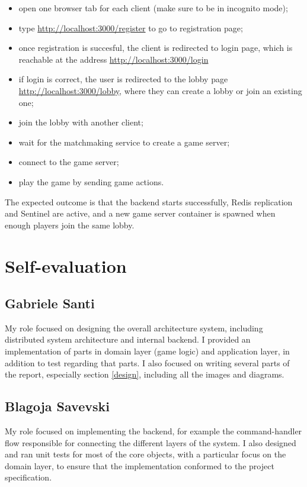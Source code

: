\documentclass{scrartcl}
\begin{document}
\begin{itemize}
    \item open one browser tab for each client (make sure to be in incognito mode);
    \item type \url{http://localhost:3000/register} to go to registration page;
    \item once registration is succesful, the client is redirected to login page, which is reachable at the address \url{http://localhost:3000/login}
    \item if login is correct, the user is redirected to the lobby page \url{http://localhost:3000/lobby}, where they can create a lobby or join an existing one;
    \item join the lobby with another client;
    \item wait for the matchmaking service to create a game server;
    \item connect to the game server;
    \item play the game by sending game actions.
\end{itemize}

The expected outcome is that the backend starts successfully, Redis replication and Sentinel are active, and a new game server container is spawned when enough players join the same lobby. 
\newpage

\section{Self-evaluation}\label{self-evaluation}
\subsection{Gabriele Santi}
My role focused on designing the overall architecture system, including distributed system architecture and internal backend.
I provided an implementation of parts in domain layer (game logic) and application layer, in addition to test regarding that parts. 
I also focused on writing several parts of the report, especially section \autoref{design}, including all the images and diagrams.

\subsection{Blagoja Savevski}
My role focused on implementing the backend, for example the command-handler flow responsible for connecting the different layers of the system. I also designed and ran unit tests for most of the core objects, with a particular focus on the domain layer, to ensure that the implementation conformed to the project specification.
\end{document}

